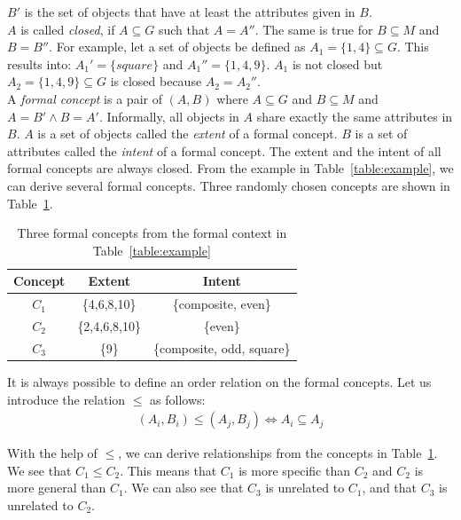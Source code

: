 \documentclass[11pt]{report}
\begin{document}
$B'$ is the set of objects that have at least the attributes given in $B$. \\

$A$ is called \textit{closed}, if $A \subseteq G$ such that $A = A''$. The same is true for $B \subseteq M$ and $B = B''$. For example, let a set of objects be defined as $A_1 = \{1,4\} \subseteq G$. This results into: $A_1' = \{square\}$ and $A_1'' = \{1,4,9\}$. $A_1$ is not closed but $A_2 = \{1,4,9\} \subseteq G$ is closed because $A_2 = A_2''$. \\   

A \textit{formal concept} is a pair of $(A, B)$ where $A \subseteq G$ and $B \subseteq M$ and $A = B' \wedge B = A' $. Informally, all objects in $A$ share exactly the same attributes in $B$. $A$ is a set of objects called the \textit{extent} of a formal concept. $B$ is a set of attributes called the \textit{intent} of a formal concept. The extent and the intent of all formal concepts are always closed. From the example in Table~\ref{table:example}, we can derive several formal concepts. Three randomly chosen concepts are shown in Table~\ref{table:exampleConcepts}. \\

\begin{table}[h]
\caption{Three formal concepts from the formal context in Table~\ref{table:example}}
\label{table:exampleConcepts}
\centering

\def\arraystretch{1.2}%
\begin{tabular}{ c c c }
\hline
 Concept & Extent & Intent \\
\hline

$C_1$ & \{4,6,8,10\} & \{composite, even\} \\
$C_2$ & \{2,4,6,8,10\} & \{even\} \\
$C_3$ & \{9\} & \{composite, odd, square\} \\

\hline
\end{tabular}
\end{table}

It is always possible to define an order relation on the formal concepts. Let us introduce the relation $\le$ as follows:
\begin{align*} (A_i,B_i) \le (A_j, B_j) \Longleftrightarrow	A_i \subseteq A_j
\end{align*}

With the help of $\le$, we  can derive relationships from the concepts in Table~\ref{table:exampleConcepts}. We see that $C_1 \le C_2$. This means that $C_1$ is more specific than $C_2$ and $C_2$ is more general than $C_1$. We can also see that $C_3$ is unrelated to $C_1$, and that $C_3$ is unrelated to $C_2$. \\
\end{document}
